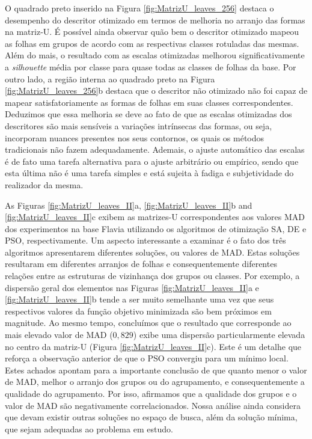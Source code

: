 O quadrado preto inserido na Figura \ref{fig:MatrizU_leaves_256} destaca o desempenho do descritor otimizado em termos de melhoria no arranjo das formas na matriz-U. É possível ainda observar quão bem o descritor otimizado mapeou as folhas em grupos de acordo com as respectivas classes rotuladas das mesmas.  Além do mais, o resultado com as escalas otimizadas melhorou significativamente a \emph{silhouette} média por classe para quase todas as classes de folhas da base. Por outro lado, a região interna ao quadrado preto na Figura \ref{fig:MatrizU_leaves_256}b destaca que o descritor não otimizado não foi capaz de mapear satisfatoriamente as formas de  folhas em suas classes correspondentes. Deduzimos que essa melhoria se deve ao fato de que as escalas otimizadas dos descritores são mais sensíveis a variações intrínsecas das formas, ou seja, incorporam nuances presentes nos seus contornos, os quais os métodos tradicionais não fazem adequadamente. Ademais, o ajuste automático das escalas é de fato uma tarefa alternativa para o ajuste arbitrário ou empírico, sendo que esta última não é uma tarefa simples e está sujeita à fadiga e subjetividade do realizador da mesma.


As Figuras \ref{fig:MatrizU_leaves_II}a, \ref{fig:MatrizU_leaves_II}b and \ref{fig:MatrizU_leaves_II}c exibem as matrizes-U correspondentes aos valores \ac{MAD} dos experimentos na base Flavia utilizando os algoritmos de otimização \ac{SA}, \ac{DE} e \ac{PSO}, respectivamente. Um aspecto interessante a examinar é o fato dos três algoritmos apresentarem diferentes soluções, ou valores de \ac{MAD}. Estas soluções resultaram em diferentes arranjos de folhas e consequentemente diferentes relações entre as estruturas de vizinhança dos grupos ou classes.
Por exemplo, a dispersão geral dos elementos nas Figuras \ref{fig:MatrizU_leaves_II}a e \ref{fig:MatrizU_leaves_II}b tende a ser muito semelhante uma vez que seus respectivos valores da função objetivo minimizada são bem próximos em magnitude. Ao mesmo tempo, concluímos que o resultado que corresponde ao mais elevado valor de \ac{MAD} ($0,829$) exibe uma dispersão particularmente elevada no centro da matriz-U (Figura \ref{fig:MatrizU_leaves_II}c). Este é um detalhe que reforça a observação anterior de que o \ac{PSO} convergiu para um mínimo local. 
Estes achados apontam para a importante conclusão de que quanto menor o valor de \ac{MAD}, melhor o arranjo dos grupos ou do agrupamento, e consequentemente a qualidade do agrupamento. Por isso, afirmamos que a qualidade dos grupos e o valor de \ac{MAD} são negativamente correlacionados. Nossa análise ainda considera que devam existir outras soluções no espaço de busca, além da solução mínima, que sejam adequadas ao problema em estudo.

